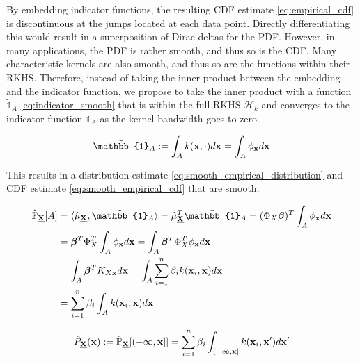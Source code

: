 \documentclass[twoside]{article} \usepackage{aistats2017}
\theoremstyle{definition}
\theoremstyle{remark}
\newcommand{\rv}[1]{\underline{#1}}
\newcommand{\ds}[1]{{#1}}
\begin{document}
		By embedding indicator functions, the resulting CDF estimate \eqref{eq:empirical_cdf} is discontinuous at the jumps located at each data point. Directly differentiating this would result in a superposition of Dirac deltas for the PDF. However, in many applications, the PDF is rather smooth, and thus so is the CDF. Many characteristic kernels are also smooth, and thus so are the functions within their RKHS. Therefore, instead of taking the inner product between the embedding and the indicator function, we propose to take the inner product with a function $\tilde{\mathbb{1}}_{A}$ \eqref{eq:indicator_smooth} that is within the full RKHS $\mathcal{H}_{k}$ and converges to the indicator function $\mathbb{1}_{A}$ as the kernel bandwidth goes to zero.
		
		\begin{equation}
			\tilde{\mathbb{1}}_{A} := \int_{A} k(\bvec{x}, \cdot) d\bvec{x} = \int_{A} \phi_{\bvec{x}} d\bvec{x}
		\label{eq:indicator_smooth}
		\end{equation}
		
		This results in a distribution estimate \eqref{eq:smooth_empirical_distribution} and CDF estimate \eqref{eq:smooth_empirical_cdf} that are smooth.

		\begin{equation}
		\begin{aligned}
			\hat{\mathbb{P}}_{\bvec{\rv{X}}}[A] &= \langle \hat{\mu}_{\bvec{\rv{X}}}, \tilde{\mathbb{1}}_{A} \rangle = \hat{\mu}_{\bvec{\rv{X}}}^{T} \tilde{\mathbb{1}}_{A} = (\Phi_{\ds{X}} \bm{\beta})^{T} \int_{A} \phi_{\bvec{x}} d\bvec{x} \\
			&= \bm{\beta}^{T} \Phi_{\ds{X}}^{T} \int_{A} \phi_{\bvec{x}} d\bvec{x} = \int_{A} \bm{\beta}^{T} \Phi_{\ds{X}}^{T} \phi_{\bvec{x}} d\bvec{x} \\
			&= \int_{A} \bm{\beta}^{T} K_{\ds{X} \bvec{x}} d\bvec{x} = \int_{A} \sum_{i = 1}^{n} \beta_{i} k(\bvec{x}_{i}, \bvec{x}) d\bvec{x} \\
			&= \sum_{i = 1}^{n} \beta_{i} \int_{A}  k(\bvec{x}_{i}, \bvec{x}) d\bvec{x} \\
		\end{aligned}
		\label{eq:smooth_empirical_distribution}
		\end{equation}	
		
		\begin{equation}
			\hat{P}_{\bvec{\rv{X}}}(\bvec{x}) := \hat{\mathbb{P}}_{\bvec{\rv{X}}}[(-\bvec{\infty}, \bvec{x}]] = \sum_{i = 1}^{n} \beta_{i} \int_{(-\bvec{\infty}, \bvec{x}]}  k(\bvec{x}_{i}, \bvec{x}') d\bvec{x}'
		\label{eq:smooth_empirical_cdf}
		\end{equation}
		
\end{document}
